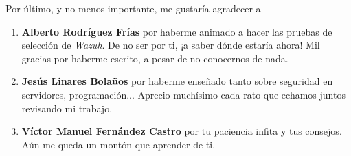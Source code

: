 Por último, y no menos importante, me gustaría agradecer a 

\begin{enumerate}[---]
	\item \textbf{Alberto Rodríguez Frías} por haberme animado a hacer las pruebas de selección de \textit{Wazuh}. De no ser por ti, ¡a saber dónde estaría ahora! Mil gracias por haberme escrito, a pesar de no conocernos de nada.
	\item \textbf{Jesús Linares Bolaños} por haberme enseñado tanto sobre seguridad en servidores, programación... Aprecio muchísimo cada rato que echamos juntos revisando mi trabajo.
	\item \textbf{Víctor Manuel Fernández Castro} por tu paciencia infita y tus consejos. Aún me queda un montón que aprender de ti.
\end{enumerate}
